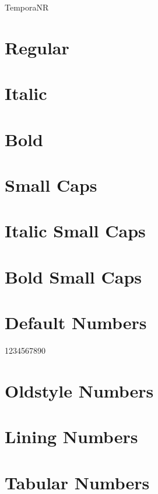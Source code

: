 \documentclass[a4paper]{article}
\begin{document}
\thispagestyle{empty}

\begin{center}\huge TemporaNR
\end{center}


\section*{Regular}
\lipsum[1]

\section*{Italic}
\emph{\lipsum[2]}

\section*{Bold}
\textbf{\lipsum[1]}

\section*{Small Caps}
\textsc{\lipsum[1]}

\section*{Italic Small Caps}
\emph{\textsc{\lipsum[2]}}

\section*{Bold Small Caps}
\textsc{\textbf{\lipsum[1]}}

\section*{Default Numbers}

1234567890

\section*{Oldstyle Numbers}


\section*{Lining Numbers}


\section*{Tabular Numbers}
\end{document}
